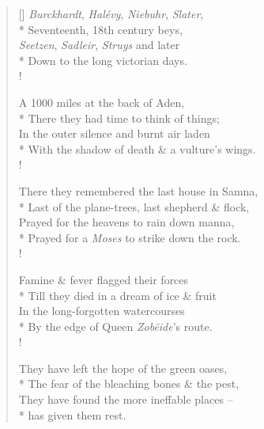 \documentclass[MAIN]{subfiles}
\begin{document}
\begin{verse}[\versewidth]
\emph{Burckhardt}, \emph{Hal\'evy}, \emph{Niebuhr}, \emph{Slater},\\*
\vin Seventeenth, 18th century beys,\\
\emph{Seetzen}, \emph{Sadleir}, \emph{Struys} and later\\*
\vin Down to the long victorian days.\\!

A 1000 miles at the back of {\sc Aden},\\*
\vin There they had time to think of things;\\
In the outer silence and burnt air laden\\*
\vin With the shadow of death \& a vulture's wings.\\!

There they remembered the last house in {\sc Samna},\\*
\vin Last of the plane-trees, last shepherd \& flock,\\
Prayed for the heavens to rain down manna,\\*
\vin Prayed for a \emph{Moses} to strike down the rock.\\!

Famine \& fever flagged their forces\\*
\vin Till they died in a dream of ice \& fruit\\
In the long-forgotten watercourses\\*
\vin By the edge of Queen \emph{Zob\"eide}'s route.\\!

They have left the hope of the green oases,\\*
\vin The fear of the bleaching bones \& the pest,\\
They have found the more ineffable places --\\*
 has given them rest.
\end{verse}
\end{document}
